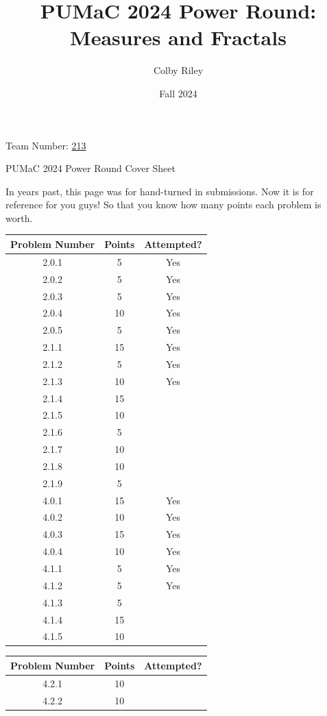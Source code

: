 \documentclass[11pt]{article}
\title{PUMaC 2024 Power Round: \\ Measures and Fractals}
\author{Colby Riley}
\date{Fall 2024}
\theoremstyle{definition}
\theoremstyle{remark}
\theoremstyle{problem}
\begin{document}
\thispagestyle{empty}
\noindent \huge{Team Number:} \underline{213\phantom{}}

\vspace{.5cm}
\noindent \huge{PUMaC 2024 Power Round Cover Sheet}

\vspace{.5cm}
\normalsize
In years past, this page was for hand-turned in submissions. Now it is for reference for you guys! So that you know how many points each problem is worth. 

\begin{center}
\begin{tabular}{|c|c|c|}\hline
Problem Number & Points & Attempted?\\\hline
2.0.1 & 5 & Yes \\\hline
2.0.2 & 5 & Yes \\\hline
2.0.3 & 5 & Yes \\\hline
2.0.4 & 10 & Yes \\\hline
2.0.5 & 5 & Yes \\\hline
2.1.1 & 15 & Yes \\\hline
2.1.2 & 5 & Yes \\\hline
2.1.3 & 10 & Yes \\\hline
2.1.4 & 15 & \\\hline
2.1.5 & 10 & \\\hline
2.1.6 & 5 & \\\hline
2.1.7 & 10 & \\\hline
2.1.8 & 10 & \\\hline
2.1.9 & 5 & \\\hline
4.0.1 & 15 & Yes \\\hline
4.0.2 & 10 & Yes \\\hline
4.0.3 & 15 & Yes \\\hline
4.0.4 & 10 & Yes \\\hline
4.1.1 & 5 & Yes \\\hline
4.1.2 & 5 & Yes \\\hline
4.1.3 & 5 & \\\hline
4.1.4 & 15 & \\\hline
4.1.5 & 10 & \\\hline
\end{tabular}
\hspace{0.5 cm}
\begin{tabular}{|c|c|c|}\hline
Problem Number & Points & Attempted?\\\hline
4.2.1 & 10 & \\\hline
4.2.2 & 10 & \\\hline

\end{tabular}
\end{center}
\end{document}
